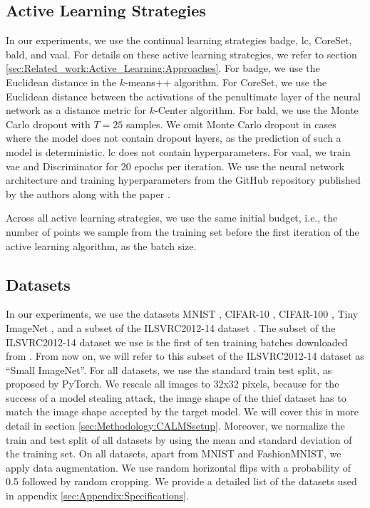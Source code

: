 \subsection{Active Learning Strategies}
\label{sec:ExperimentSetup:ALStrategies}
In our experiments, we use the continual learning strategies \gls{badge}, \gls{lc}, CoreSet, \gls{bald}, and \gls{vaal}. For details on these active learning
strategies, we refer to section \ref{sec:Related_work:Active_Learning:Approaches}. For \gls{badge}, we use the Euclidean distance in the $k$-means++
algorithm. For CoreSet, we use the Euclidean distance between the activations of the penultimate layer of the neural network as a distance metric for $k$-Center
algorithm. For \gls{bald}, we use the Monte Carlo dropout with $T=25$ samples. We omit Monte Carlo dropout in cases where the model does not contain dropout layers,
as the prediction of such a model is deterministic. \gls{lc} does not contain hyperparameters. For \gls{vaal}, we train \gls{vae} and Discriminator for 20 epochs
per iteration. We use the neural network architecture and training hyperparameters from the GitHub repository published by the authors along with the paper 
\cite{vaalRepo}. \par
Across all active learning strategies, we use the same initial budget, i.e., the number of points we sample from the training set before the first iteration
of the active learning algorithm, as the batch size.

\subsection{Datasets}
\label{sec:ExperimentSetup:Datasets}
In our experiments, we use the datasets MNIST \cite{mnist_web}, CIFAR-10 \cite{cifar},
CIFAR-100 \cite{cifar}, Tiny ImageNet \cite{le2015tiny}, and a subset of the ILSVRC2012-14 dataset \cite{imagenet}. The subset of the ILSVRC2012-14 dataset we
use is the first of ten training batches downloaded from \cite{imageNetDataset}. From now on, we will refer to this subset
of the ILSVRC2012-14 dataset as \enquote{Small ImageNet}. For all datasets, we use the standard train test split, as proposed by PyTorch. We rescale all images to 32x32
pixels, because for the success of a model stealing attack, the image shape of the thief dataset has to match the image shape accepted by the target model. We will cover
this in more detail in section \ref{sec:Methodology:CALMSsetup}. Moreover, we normalize the train and test split of all datasets by using the mean and standard deviation
of the training set. On all datasets, apart from MNIST and FashionMNIST, we apply data augmentation. We use random horizontal flips with a probability of 0.5
followed by random cropping. We provide a detailed list of the datasets used in appendix \ref{sec:Appendix:Specifications}. \par

